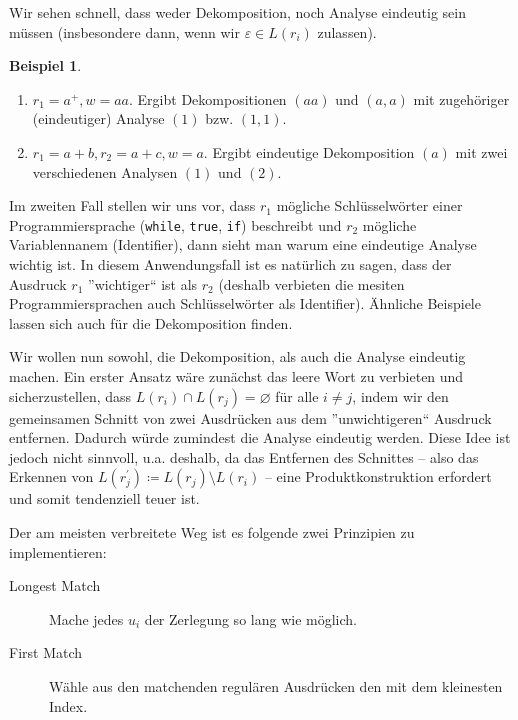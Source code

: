 \documentclass[11pt, a4paper]{article}
\theoremstyle{definition}
\newtheorem{example}[definition]{Beispiel}
\theoremstyle{plain}
\numberwithin{equation}{section}
\let\emptyset\varnothing
\begin{document}
Wir sehen schnell, dass weder Dekomposition, noch Analyse eindeutig sein müssen (insbesondere dann, wenn wir $\varepsilon \in L(r_i)$ zulassen).
\begin{example}
	\begin{enumerate}
		\item $r_1 = a^+, w = aa$. Ergibt Dekompositionen $(aa)$ und $(a, a)$ mit zugehöriger (eindeutiger) Analyse $(1)$ bzw. $(1, 1)$.
		\item $r_1 = a+b, r_2 = a+c, w = a$. Ergibt eindeutige Dekomposition $(a)$ mit zwei verschiedenen Analysen $(1)$ und $(2)$.	
	\end{enumerate}
	Im zweiten Fall stellen wir uns vor, dass $r_1$ mögliche Schlüsselwörter einer Programmiersprache (\texttt{while}, \texttt{true}, \texttt{if}) beschreibt und $r_2$ mögliche Variablennanem (Identifier), dann sieht man warum eine eindeutige Analyse wichtig ist. In diesem Anwendungsfall ist es natürlich zu sagen, dass der Ausdruck $r_1$ ''wichtiger`` ist als $r_2$ (deshalb verbieten die mesiten Programmiersprachen auch Schlüsselwörter als Identifier). Ähnliche Beispiele lassen sich auch für die Dekomposition finden.
\end{example}

Wir wollen nun sowohl, die Dekomposition, als auch die Analyse eindeutig machen. Ein erster Ansatz wäre zunächst das leere Wort zu verbieten und sicherzustellen, dass $L(r_i) \cap L(r_j) = \emptyset$ für alle $i \neq j$, indem wir den gemeinsamen Schnitt von zwei Ausdrücken aus dem ''unwichtigeren`` Ausdruck entfernen. Dadurch würde zumindest die Analyse eindeutig werden. Diese Idee ist jedoch nicht sinnvoll, u.a. deshalb, da das Entfernen des Schnittes -- also das Erkennen von $L(r_j^\prime) \coloneqq L(r_j) \setminus L(r_i)$ -- eine Produktkonstruktion erfordert und somit tendenziell teuer ist.


Der am meisten verbreitete Weg ist es folgende zwei Prinzipien zu implementieren:
\begin{description}
	\item[Longest Match] Mache jedes $u_i$ der Zerlegung so lang wie möglich.
	\item[First Match] Wähle aus den matchenden regulären Ausdrücken den mit dem kleinesten Index.
\end{description}
\end{document}
